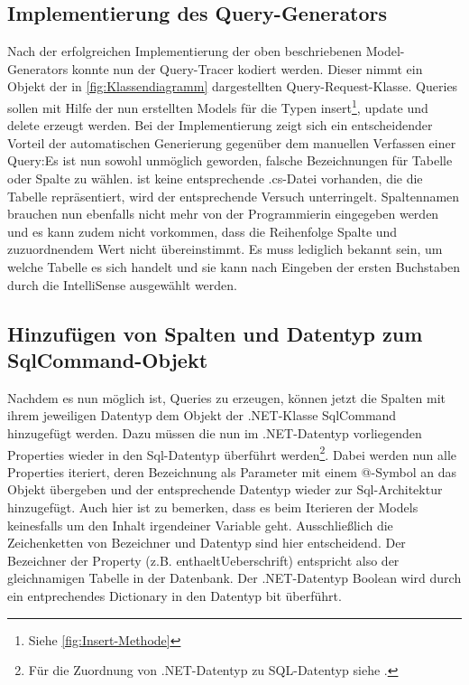 \documentclass[11pt,toc=sectionentrywithoutdots, 
headheight=44pt, headings=optiontoheadandtoc, hyperfootnotes=false, hypertexnames=false]{scrartcl}
\newcommand\extendedref[1]{Siehe \ref{#1}}
\begin{document}
\subsection{Implementierung des Query-Generators}
Nach der erfolgreichen Implementierung der oben beschriebenen Model-Generators konnte nun der Query-Tracer kodiert werden. Dieser nimmt ein Objekt der in \ref{fig:Klassendiagramm} dargestellten Query-Request-Klasse. Queries sollen mit Hilfe der nun erstellten Models für die Typen \glqq insert\footnote{\extendedref{fig:Insert-Methode}}\grqq{}, \glqq update \grqq{} und \glqq delete \grqq{} erzeugt werden. Bei der Implementierung zeigt sich ein entscheidender Vorteil der automatischen Generierung gegenüber dem manuellen Verfassen einer Query:\newline Es ist nun sowohl unmöglich geworden, falsche Bezeichnungen für Tabelle oder Spalte zu wählen. ist keine entsprechende .cs-Datei vorhanden, die die Tabelle repräsentiert, wird der entsprechende Versuch unterringelt. Spaltennamen brauchen nun ebenfalls nicht mehr von der Programmierin eingegeben werden und es kann zudem nicht vorkommen, dass die Reihenfolge Spalte und zuzuordnendem Wert nicht übereinstimmt. Es muss lediglich bekannt sein, um welche Tabelle es sich handelt und sie kann nach Eingeben der ersten Buchstaben durch die \gls{IntelliSense} ausgewählt werden.

\subsection{Hinzufügen von Spalten und Datentyp zum SqlCommand-Objekt}
Nachdem es nun möglich ist, Queries zu erzeugen, können jetzt die Spalten mit ihrem jeweiligen Datentyp dem Objekt der .NET-Klasse SqlCommand hinzugefügt werden. Dazu müssen die nun im .NET-Datentyp vorliegenden Properties wieder in den Sql-Datentyp überführt werden\footnote{Für die Zuordnung von .NET-Datentyp zu SQL-Datentyp siehe \cite{Microsoft2021}.}. Dabei werden nun alle Properties iteriert, deren Bezeichnung als Parameter mit einem @-Symbol an das Objekt übergeben und der entsprechende Datentyp wieder zur Sql-Architektur hinzugefügt. Auch hier ist zu bemerken, dass es beim Iterieren der Models keinesfalls um den Inhalt irgendeiner Variable geht. Ausschließlich die Zeichenketten von Bezeichner und Datentyp sind hier entscheidend. Der Bezeichner der Property (z.B. \glqq enthaeltUeberschrift\grqq{}) entspricht also der gleichnamigen Tabelle in der Datenbank. Der .NET-Datentyp \glqq Boolean\grqq{} wird durch ein entprechendes \gls{Dictionary} in den Datentyp \glqq bit\grqq{} überführt.
\end{document}
